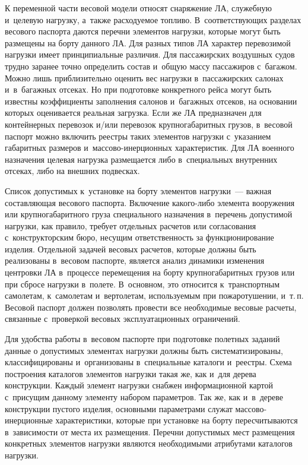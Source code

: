 \begin{multicols}{2}
  К переменной части весовой модели относят снаряжение 
ЛА, служебную и~целевую нагрузку, а~также расходуемое топливо. 
В~соответствующих разделах весового паспорта даются перечни элементов 
нагрузки, которые могут быть размещены на борту данного 
ЛА. Для разных типов ЛА характер перевозимой 
нагрузки имеет принципиальные различия. Для пассажирских воздушных судов 
трудно заранее точно определить состав и~общую массу пассажиров с~багажом. 
Можно лишь приблизительно оценить вес нагрузки в~пассажирских салонах 
и~в~багажных отсеках. Но при подготовке конкретного рейса могут быть 
известны коэффициенты заполнения салонов и~багажных отсеков, на основании 
которых оценивается реальная загрузка. Если же ЛА
пред\-на\-зна\-чен для контейнерных перевозок и/или перевозок крупногабаритных 
грузов, в~весовой паспорт можно включить реестры таких элементов нагрузки 
с~указанием габаритных размеров и~мас\-со\-во-инер\-ци\-он\-ных 
характеристик. Для ЛА военного назначения целевая нагрузка размещается 
либо в~специальных внутренних отсеках, либо на внешних подвесках.
  
  Список допустимых к~установке на борту элементов нагрузки~--- важная 
составляющая весового паспорта. Включение какого-либо элемента 
вооружения или крупногабаритного груза специального назначения в~перечень 
допустимой нагрузки, как правило, требует отдельных расчетов или 
согласования с~конструкторским бюро, несущим ответственность за 
функционирование изделия. Отдельной задачей весовых расчетов, которые 
должны быть реализованы в~весовом паспорте, является анализ динамики 
изменения центровки ЛА в~процессе перемещения на борту крупногабаритных 
грузов или при сбросе нагрузки в~полете. В~основном, это относится 
к~транспортным самолетам, к~самолетам и~вертолетам, используемым при 
пожаротушении, и~т.\,п. Весовой паспорт должен позволять провести все 
необходимые весовые расчеты, связанные с~проверкой весовых 
эксплуатационных ограничений. 
  
  Для удобства работы в~весовом паспорте при подготовке полетных заданий 
данные о допустимых элементах нагрузки должны быть систематизированы, 
классифицированы и~организованы в~специальные каталоги и~реестры. Схема 
построения каталогов элементов нагрузки такая же, как и~для дерева 
конструкции. Каждый элемент нагрузки снабжен информационной картой 
с~присущим данному элементу набором параметров. Так же, как и~в~дереве 
конструкции пустого изделия, основными параметрами служат  
мас\-со\-во-инер\-ци\-он\-ные характеристики, которые при установке на борту 
пересчитываются в~зависимости от места их размещения. Перечни допустимых 
мест размещения конкретных элементов нагрузки являются необходимыми 
атрибутами каталогов нагрузки.
\vspace*{-6pt}


\end{multicols}
